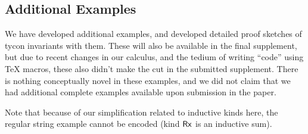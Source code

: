 \documentclass[12pt]{article}
\begin{document}
\subsection{Additional Examples}
We have developed additional examples, and developed detailed proof sketches of tycon invariants with them. These will also be available in the final supplement, but due to recent changes in our calculus, and the tedium of writing ``code'' using TeX macros, these also didn't make the cut in the submitted supplement. There is nothing conceptually novel in these examples, and we did not claim that we had additional complete examples available upon submission in the paper.

Note that because of our simplification related to inductive kinds here, the regular string example cannot be encoded (kind ${\sf Rx}$ is an inductive sum).




\clearpage




\end{document}

